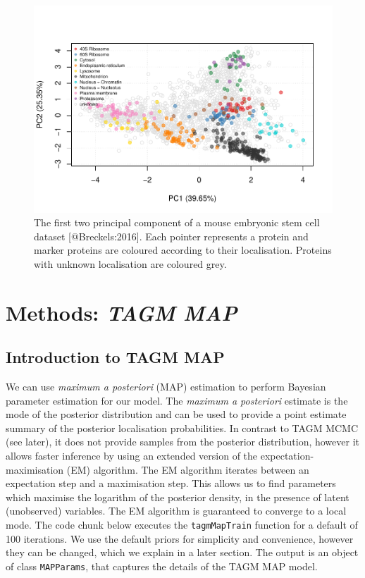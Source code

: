 \documentclass[
]{article}
\begin{document}
\begin{figure}
\includegraphics[width=0.8\linewidth]{F1000TAGMworkflow_rev1_files/figure-latex/e14pca1-1} \caption{The first two principal component of a mouse embryonic stem cell dataset [@Breckels:2016]. Each pointer represents a protein and marker proteins are coloured according to their localisation. Proteins with unknown localisation are coloured grey.}\label{fig:e14pca1}
\end{figure}

\hypertarget{methods-tagm-map}{%
\section{\texorpdfstring{Methods: \emph{TAGM
MAP}}{Methods: TAGM MAP}}\label{methods-tagm-map}}

\hypertarget{introduction-to-tagm-map}{%
\subsection{Introduction to TAGM MAP}\label{introduction-to-tagm-map}}

We can use \emph{maximum a posteriori} (MAP) estimation to perform
Bayesian parameter estimation for our model. The \emph{maximum a
posteriori} estimate is the mode of the posterior distribution and can
be used to provide a point estimate summary of the posterior
localisation probabilities. In contrast to TAGM MCMC (see later), it
does not provide samples from the posterior distribution, however it
allows faster inference by using an extended version of the
expectation-maximisation (EM) algorithm. The EM algorithm iterates
between an expectation step and a maximisation step. This allows us to
find parameters which maximise the logarithm of the posterior density,
in the presence of latent (unobserved) variables. The EM algorithm is
guaranteed to converge to a local mode. The code chunk below executes
the \texttt{tagmMapTrain} function for a default of 100 iterations. We
use the default priors for simplicity and convenience, however they can
be changed, which we explain in a later section. The output is an object
of class \texttt{MAPParams}, that captures the details of the TAGM MAP
model.
\end{document}
